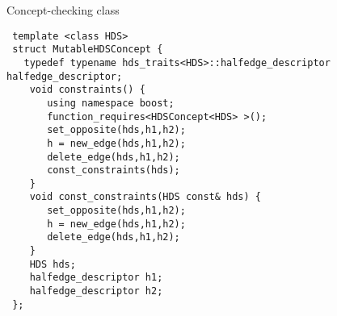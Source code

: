 \begin{Desc}
\item[Concept-checking class]

\begin{Code}\begin{verbatim} template <class HDS> 
 struct MutableHDSConcept {
   typedef typename hds_traits<HDS>::halfedge_descriptor halfedge_descriptor; 
    void constraints() {
       using namespace boost;
       function_requires<HDSConcept<HDS> >();
       set_opposite(hds,h1,h2);
       h = new_edge(hds,h1,h2);
       delete_edge(hds,h1,h2);
       const_constraints(hds);
    }
    void const_constraints(HDS const& hds) {
       set_opposite(hds,h1,h2);
       h = new_edge(hds,h1,h2);
       delete_edge(hds,h1,h2);
    }
    HDS hds;
    halfedge_descriptor h1;
    halfedge_descriptor h2;
 };
\end{verbatim}\end{Code}

 \end{Desc}
